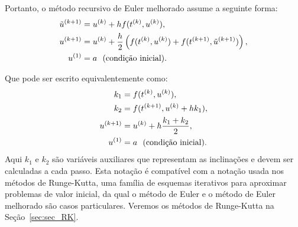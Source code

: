 Portanto, o método recursivo de Euler melhorado assume a seguinte forma:
\begin{equation}
 \begin{split}
\tilde{u}^{(k+1)}&=u^{(k)}+h f(t^{(k)},u^{(k)}),\\
u^{(k+1)}&=u^{(k)}+\frac{h}{2}\left(f(t^{(k)},u^{(k)})+f(t^{(k+1)},\tilde{u}^{(k+1)})\right),\\
u^{(1)}&=a~~ \hbox{\text{(condição inicial)}}.
 \end{split}
\end{equation}


Que pode ser escrito equivalentemente como:
\begin{equation}
 \begin{split}
k_1&=f(t^{(k)},u^{(k)}),\\
k_2&=f(t^{(k+1)},u^{(k)}+h k_1),\\
u^{(k+1)}&=u^{(k)}+h\dfrac{k_1+k_2}{2},\\
u^{(1)}&=a~~ \hbox{\text{(condição inicial)}}.
 \end{split}
\end{equation}
Aqui $k_1$ e $k_2$ são variáveis auxiliares que representam as inclinações e devem ser calculadas a cada passo. Esta notação é compatível com a notação usada nos métodos de Runge-Kutta, uma família de esquemas iterativos para aproximar problemas de valor inicial, da qual o método de Euler e o método de Euler melhorado são casos particulares. Veremos os métodos de Runge-Kutta na Seção~\ref{sec:sec_RK}.

